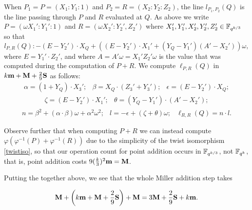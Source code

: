 When $P_1  = P = (X_1:Y_1:1)$ and $P_2 = R = (X_2:Y_2:Z_2)$, 
the line $l_{P_1,P_2}(Q)$ is the line passing through $P$ and $R$ evaluated at $Q$.
As above we write $P = (\omega X_1':Y_1':1)$ and 
$R = (\omega X_2': Y_2', Z_2')$ where $X_1',Y_1',X_2',Y_2',Z_2' \in \mathbb{F}_{q^{k/3}}$ 
so that
$$l_{P,R}(Q): - (E - Y_2') \cdot X_{Q} + ((E - Y_2') \cdot X_1' + (Y_{Q}-Y_1')(A'-X_2'))\omega, $$
where $E = Y_1' \cdot Z_2'$, and where $A = A'\omega = X_1'Z_2'\omega$ is the value that was computed during the computation of $P+R$.
We compute $\ell_{P,R}(Q)$ in
$k\textbf{m} + \textbf{M} + \frac{2}{9}\textbf{S}$
as follows:
\[\begin{array}{ccc}
\alpha = (1+Y_Q)\cdot X_3';&
 \beta = X_Q\cdot (Z_3' + Y_3'); &
 \epsilon = (E-Y_2')\cdot X_Q;
\end{array}\]
\[\begin{array}{cc}
 \zeta = (E-Y_2')\cdot X_1'; &
  \theta = (Y_Q-Y_1')\cdot(A'-X_2');
\end{array}\]
\[\begin{array}{ccc}
n = \beta^2 + (\alpha \cdot \beta) \omega + \alpha^2 \omega^2; &
l = -\epsilon + (\zeta+\theta)\omega; &
\ell_{R,R}(Q) = n\cdot l.
\end{array}\]

Observe further that when computing $P+R$ we can instead compute
$\varphi(\varphi^{-1}(P) + \varphi^{-1}(R))$ due to the simplicity of the twist isomorphism \eqref{twistiso},
so that our operation count for point addition occurs in $\mathbb{F}_{q^{k/3}}$, not $\mathbb{F}_{q^k}$, that is,
point addition costs $9(\frac{k}{3})^2\textbf{m} = \textbf{M}$.

Putting the together above, we see that the whole Miller addition step takes

\[\textbf{M} + \left( k\textbf{m} + \textbf{M} + \frac{2}{9}\textbf{S} \right) + \textbf{M} = 3\textbf{M} + \frac{2}{9}\textbf{S} + k\textbf{m}.\]

